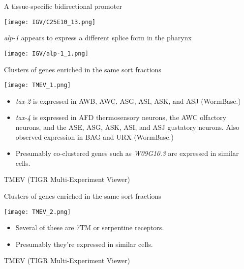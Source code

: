 \documentclass[serif,9pt]{beamer}
\begin{document}
\begin{frame}{A tissue-specific bidirectional promoter}

\texttt{[image: IGV/C25E10\_13.png]}

\end{frame}

\begin{frame}{{\em alp-1} appears to express a different splice form in the pharynx}
\begin{center}
\texttt{[image: IGV/alp-1\_1.png]}
\end{center} 
\end{frame}


\begin{frame}{Clusters of genes enriched in the same sort fractions}
\begin{minipage}{0.5\textwidth}
\texttt{[image: TMEV\_1.png]}
\end{minipage}
\begin{minipage}{0.48\textwidth}
{\small 
\begin{itemize}

\item {\em tax-2} is expressed in AWB, AWC, ASG, ASI, ASK, and ASJ (WormBase.)

\item {\em tax-4} is expressed in AFD thermosensory neurons, the AWC olfactory neurons, and the ASE, ASG, ASK, ASI, and ASJ gustatory neurons. Also observed expression in BAG and URX (WormBase.)

\item Presumably co-clustered genes such as {\em W09G10.3} are expressed
in similar cells.

\end{itemize}
}
\end{minipage}
\vspace{5mm}

\hfill TMEV (TIGR Multi-Experiment Viewer)
\end{frame}

\begin{frame}{Clusters of genes enriched in the same sort fractions}
\begin{minipage}{0.5\textwidth}
\texttt{[image: TMEV\_2.png]}
\end{minipage}
\begin{minipage}{0.48\textwidth}
{\small 
\begin{itemize}

\item Several of these are 7TM or serpentine receptors.

\item Presumably they're expressed in similar cells.

\end{itemize}
}
\end{minipage}
\vspace{5mm}

\hfill TMEV (TIGR Multi-Experiment Viewer)
\end{frame}
\end{document}
